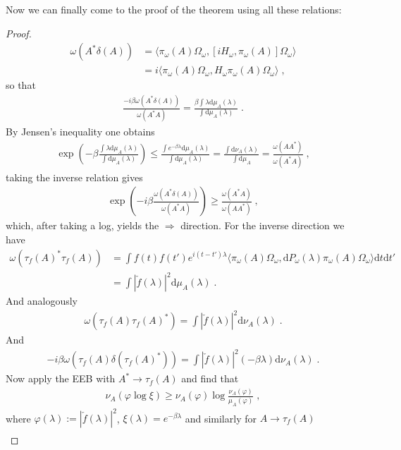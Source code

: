 \documentclass[
a4paper, %
11pt, %
onecolumn, %
openany, %
]{memoir}
\theoremstyle{definition}
\theoremstyle{remark}
\theoremstyle{plain}
\begin{document}
Now we can finally come to the proof of the theorem using all these relations: \begin{proof}
\begin{align}
\omega(A^*\delta(A))&=\langle\pi_{\omega}(A)\Omega_{\omega},\left[iH_{\omega},\pi_{\omega}(A)\right]\Omega_{\omega}\rangle\\
&=i\langle \pi_{\omega}(A)\Omega_{\omega},H_{\omega}\pi_{\omega}(A)\Omega_{\omega}\rangle\; ,
\end{align}
so that \begin{align}
\frac{-i\beta\omega(A^*\delta(A))}{\omega(A^*A)}=\frac{\beta \int \lambda \mathrm{d}\mu_A(\lambda)}{\int\mathrm{d}\mu_A(\lambda)}\; .
\end{align}
By Jensen's inequality one obtains \begin{align}
\exp\left(-\beta \frac{\int\lambda\mathrm{d}\mu_A(\lambda)}{\int\mathrm{d}\mu_A(\lambda)}\right)\leq \frac{\int e^{-\beta\lambda}\mathrm{d}\mu_A(\lambda)}{\int\mathrm{d}\mu_{A}(\lambda)}=\frac{\int\mathrm{d}\nu_A(\lambda)}{\int\mathrm{d}\mu_A}=\frac{\omega(AA^*)}{\omega(A^*A)}\; ,
\end{align}
taking the inverse relation gives \begin{align}
\exp\left(-i\beta\frac{\omega(A^*\delta(A))}{\omega(A^*A)}\right)\geq \frac{\omega(A^*A)}{\omega(AA^*)}\; ,
\end{align}
which, after taking a log, yields the $\Rightarrow$ direction. For the inverse direction we have \begin{align}
\omega(\tau_f(A)^*\tau_f(A))&=\int f(t)f(t')e^{i(t-t')\lambda}\langle \pi_{\omega}(A)\Omega_{\omega},\mathrm{d}P_{\omega}(\lambda)\pi_{\omega}(A)\Omega_{\omega}\rangle\mathrm{d}t\mathrm{d}t'\\
&=\int |\check{f}(\lambda)|^2\mathrm{d}\mu_A(\lambda)\; .
\end{align}
And analogously \begin{align}
\omega(\tau_f(A)\tau_f(A)^*)=\int|\check{f}(\lambda)|^2\mathrm{d}\nu_A(\lambda)\; .
\end{align}
And \begin{align}
-i\beta\omega(\tau_f(A)\delta(\tau_f(A)^*))=\int|\check{f}(\lambda)|^2(-\beta\lambda)\mathrm{d}\nu_A(\lambda)\; .
\end{align}
Now apply the EEB with $A^*\rightarrow \tau_f(A)$ and find that \begin{align}
\nu_A(\varphi\log\xi)\geq \nu_A(\varphi)\log \frac{\nu_A(\varphi)}{\mu_A(\varphi)}\; ,
\end{align}
where $\varphi(\lambda):=|\check{f}(\lambda)|^2$, $\xi(\lambda)=e^{-\beta\lambda}$ and similarly for $A\rightarrow \tau_f(A)$ \begin{align}

\end{align}
\end{proof}
\end{document}
